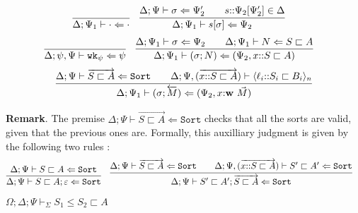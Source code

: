 \documentclass[letterpaper, 11pt]{article}
\newcommand{\Lar}{\Leftarrow}
\newcommand{\Sort}{\texttt{Sort}}
\newcommand{\wk}{\texttt{wk}}
\begin{document}
    \begin{align*}
      & \infer{\Delta; \Psi_1 \vdash \cdot \Lar \cdot}{} &
      & \infer{\Delta; \Psi_1 \vdash s[\sigma] \Lar \Psi_2}
        {
          \Delta; \Psi \vdash \sigma \Lar \Psi_2'
          &&
          s{::}\Psi_2[\Psi_2'] \in \Delta
        }
    \end{align*}
    \begin{align*}
      & \infer{\Delta; \psi, \Psi \vdash \wk_\psi \Lar \psi}{} &
      & \infer{\Delta; \Psi_1 \vdash (\sigma; N) \Lar (\Psi_2, x{::}S \sqsubset A)}
        {
          \Delta; \Psi_1 \vdash \sigma \Lar \Psi_2
          &&
          \Delta; \Psi_1 \vdash N \Lar S \sqsubset A
        }
    \end{align*}
    \begin{align*}
      \infer{\Delta; \Psi_1 \vdash (\sigma; \overleftarrow{M}) \Lar (\Psi_2, x{:} \textbf{w} \ \vec{M})}
            {
              \Delta; \Psi \vdash \overrightarrow{S \sqsubset A} \Lar \Sort
              &&
              \Delta; \Psi, (\overrightarrow{x{::}S \sqsubset A}) \vdash \langle \ell_i {::} S_i \sqsubset B_i \rangle_n
            }
    \end{align*}

    \textbf{Remark}.  The premise $\Delta; \Psi \vdash \overrightarrow{S \sqsubset A} \Lar \Sort$ checks that all the sorts are valid, given that 
    the previous ones are.  Formally, this auxilliary judgment is given by the following two rules :
    \begin{align*}
      & \infer{\Delta; \Psi \vdash S \sqsubset A ; \varepsilon \Lar \Sort}{ \Delta; \Psi \vdash S \sqsubset A \Lar \Sort} &
      & \infer{\Delta; \Psi \vdash S' \sqsubset A' ; \overrightarrow{S \sqsubset A} \Lar \Sort}
        {
          \Delta; \Psi \vdash \overrightarrow{S \sqsubset A} \Lar \Sort
          &&
          \Delta; \Psi, (\overrightarrow{x{::}S \sqsubset A}) \vdash S' \sqsubset A' \Lar \Sort
        }
    \end{align*}

    $\boxed{\Omega; \Delta; \Psi \vdash_\Sigma S_1 \leq S_2 \sqsubset A }$
    
\end{document}
